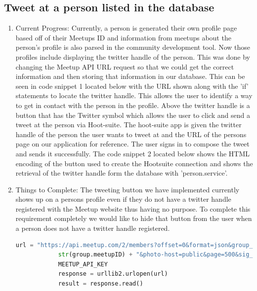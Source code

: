 \documentclass[draftclsnofoot,10pt,onecolumn]{IEEEtran} %
\begin{document}
\subsection{Tweet at a person listed in the database}
\begin{enumerate}[label*=\arabic*.]
  \item Current Progress: Currently, a person is generated their own profile page
    based off of their Meetups ID and information from meetups about the person’s
    profile is also parsed in the community development tool. Now those profiles
    include displaying the twitter handle of the person. This was done by changing
    the Meetup API URL request so that we could get the correct information and
    then storing that information in our database. This can be seen in code snippet 1 located below with the URL shown along with the 'if' statements to locate the twitter handle. This allows the user to
    identify a way to get in contact with the person in the profile. Above the
    twitter handle is a button that has the Twitter symbol which allows the user
    to click and send a tweet at the person via Hoot-suite. The hoot-suite app is
    given the twitter handle of the person the user wants to tweet at and the URL
    of the persons page on our application for reference. The user signs in to
    compose the tweet and sends it successfully. The code snippet 2 located below shows the HTML encoding of the button used to create the Hootsuite connection and shows the retrieval of the twitter handle form the database with 'person.service'.

  \item Things to Complete: The tweeting button we have implemented currently
    shows up on a persons profile even if they do not have a twitter handle
    registered with the Meetup website thus having no purpose. To complete this
    requirement completely we would like to hide that button from the user when
    a person does not have a twitter handle registered.
      

\begin{center}
  \captionsetup{width=.5\linewidth}
  \begin{lstlisting}[caption=Views.py file where twitter handle is identified and stored, language=Python]
            url = "https://api.meetup.com/2/members?offset=0&format=json&group_id=" + 
            str(group.meetupID) + "&photo-host=public&page=500&sig_id=148657742&key=" + 
            MEETUP_API_KEY
            response = urllib2.urlopen(url)
            result = response.read()


\end{lstlisting}
\end{center}
\end{enumerate}
\end{document}
